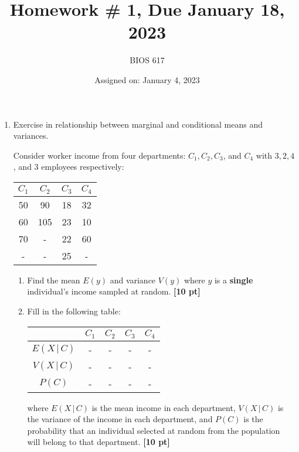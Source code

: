 \documentclass[12pt]{article}
\def\given{\, | \,}
\begin{document}
\title{Homework \# 1, Due January 18, 2023}
\author{BIOS 617}
\date{Assigned on: January 4, 2023}

\maketitle

\begin{enumerate}
\setlength{\itemsep}{15pt}%
\setlength{\parskip}{15pt}%

\item Exercise in relationship between marginal and conditional means and variances.

Consider worker income from four departments: $C_1, C_2, C_3$, and $C_4$ with $3, 2, 4$, and $3$ employees respectively:

\begin{table}[!th]
\centering
\begin{tabular}{| c c c c |}
\hline
$C_1$ & $C_2$ & $C_3$ & $C_4$ \\ \hline
50 & 90 & 18 & 32 \\
60 & 105 & 23 & 10 \\
70 & - & 22 & 60 \\
- & - & 25 & - \\ \hline
\end{tabular}
\end{table}

	\begin{enumerate}
		\setlength{\itemsep}{15pt}%
		\setlength{\parskip}{15pt}%

		\item Find the mean $E(y)$ and variance $V(y)$ where $y$ is a {\bf single} individual's income sampled at random. {\bf [10 pt]}
		\item Fill in the following table:
		\begin{table}[!th]
		\centering
		\begin{tabular}{| c | c c c c |} \hline
		& $C_1$ & $C_2$ & $C_3$ & $C_4$ \\ \hline
		$E(X \given C)$ & - & - & - & - \\
		$V(X \given C)$ & - & - & - & - \\
		$P(C)$ & - & - & - & - \\ \hline
		\end{tabular}
		\end{table}

		where $E ( X \given C )$ is the mean income in each department, $V ( X \given C )$ is the variance of the income in each department, and $P ( C )$ is the probability that an individual selected at random from the population will belong to that department. {\bf [10 pt]}


\end{enumerate}
\end{enumerate}
\end{document}
